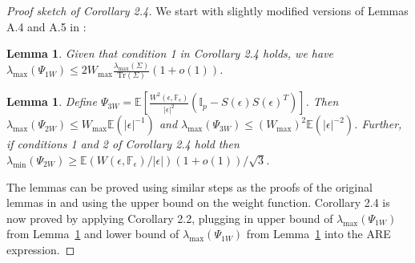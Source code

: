 \documentclass[ejs]{imsart}
\newcommand{\BE}{{\mathbb{E}}}
\newcommand{\BF}{{\mathbb{F}}}
\newcommand{\BI}{{\mathbb{I}}}
\newtheorem{Lemma}[Theorem]{Lemma}
\theoremstyle{definition} \newtheorem{Definition}[Theorem]{Definition}
\begin{document}
\begin{proof}[Proof sketch of Corollary 2.4]
%

We start with slightly modified versions of Lemmas A.4 and A.5 in \cite{ref:JASA151658_WangPengLi}:

\begin{Lemma}\label{lemma:lemmaB1}
Given that condition 1 in Corollary 2.4 holds, we have $\lambda_{\max} (\Psi_{1W}) \leq 2 W_{\max} \frac{\lambda_{\max} (\Sigma) }{\text{Tr} (\Sigma)} (1+o(1))$.
\end{Lemma}

\begin{Lemma}\label{lemma:lemmaB2}
Define $\Psi_{3W} = \BE \left[ \frac{W^2(\epsilon, \BF_\epsilon)}{| \epsilon |^2} (\BI_p - S(\epsilon) S(\epsilon)^T )\right] $. Then $\lambda_{\max} (\Psi_{2W}) \leq W_{\max} \BE(| \epsilon |^{-1})$ and $\lambda_{\max} (\Psi_{3W}) \leq (W_{\max})^2 \BE( | \epsilon|^{-2})$. Further, if conditions 1 and 2 of Corollary 2.4 hold then $\lambda_{\min} (\Psi_{2W}) \geq \BE( W(\epsilon, \BF_\epsilon)/ | \epsilon |)(1+o(1))/\sqrt 3$.
\end{Lemma}
%
The lemmas can be proved using similar steps as the proofs of the original lemmas in \cite{ref:JASA151658_WangPengLi} and using the upper bound on the weight function. Corollary 2.4 is now proved by applying Corollary 2.2, plugging in upper bound of $\lambda_{\max} (\Psi_{1W})$ from Lemma~\ref{lemma:lemmaB1} and lower bound of $\lambda_{\max} (\Psi_{1W})$ from Lemma~\ref{lemma:lemmaB2} into the ARE expression.
\end{proof}
\end{document}
